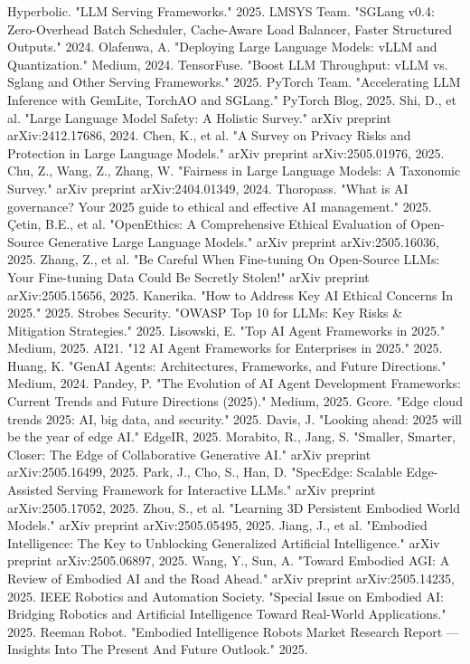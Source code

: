 \documentclass{article}
\begin{document}
\begin{thebibliography}{99}
Hyperbolic. "LLM Serving Frameworks." 2025.
LMSYS Team. "SGLang v0.4: Zero-Overhead Batch Scheduler, Cache-Aware Load Balancer, Faster Structured Outputs." 2024.
Olafenwa, A. "Deploying Large Language Models: vLLM and Quantization." Medium, 2024.
TensorFuse. "Boost LLM Throughput: vLLM vs. Sglang and Other Serving Frameworks." 2025.
PyTorch Team. "Accelerating LLM Inference with GemLite, TorchAO and SGLang." PyTorch Blog, 2025.
Shi, D., et al. "Large Language Model Safety: A Holistic Survey." arXiv preprint arXiv:2412.17686, 2024.
Chen, K., et al. "A Survey on Privacy Risks and Protection in Large Language Models." arXiv preprint arXiv:2505.01976, 2025.
Chu, Z., Wang, Z., Zhang, W. "Fairness in Large Language Models: A Taxonomic Survey." arXiv preprint arXiv:2404.01349, 2024.
Thoropass. "What is AI governance? Your 2025 guide to ethical and effective AI management." 2025.
Çetin, B.E., et al. "OpenEthics: A Comprehensive Ethical Evaluation of Open-Source Generative Large Language Models." arXiv preprint arXiv:2505.16036, 2025.
Zhang, Z., et al. "Be Careful When Fine-tuning On Open-Source LLMs: Your Fine-tuning Data Could Be Secretly Stolen!" arXiv preprint arXiv:2505.15656, 2025.
Kanerika. "How to Address Key AI Ethical Concerns In 2025." 2025.
Strobes Security. "OWASP Top 10 for LLMs: Key Risks \& Mitigation Strategies." 2025.
Lisowski, E. "Top AI Agent Frameworks in 2025." Medium, 2025.
AI21. "12 AI Agent Frameworks for Enterprises in 2025." 2025.
Huang, K. "GenAI Agents: Architectures, Frameworks, and Future Directions." Medium, 2024.
Pandey, P. "The Evolution of AI Agent Development Frameworks: Current Trends and Future Directions (2025)." Medium, 2025.
Gcore. "Edge cloud trends 2025: AI, big data, and security." 2025.
Davis, J. "Looking ahead: 2025 will be the year of edge AI." EdgeIR, 2025.
Morabito, R., Jang, S. "Smaller, Smarter, Closer: The Edge of Collaborative Generative AI." arXiv preprint arXiv:2505.16499, 2025.
Park, J., Cho, S., Han, D. "SpecEdge: Scalable Edge-Assisted Serving Framework for Interactive LLMs." arXiv preprint arXiv:2505.17052, 2025.
Zhou, S., et al. "Learning 3D Persistent Embodied World Models." arXiv preprint arXiv:2505.05495, 2025.
Jiang, J., et al. "Embodied Intelligence: The Key to Unblocking Generalized Artificial Intelligence." arXiv preprint arXiv:2505.06897, 2025.
Wang, Y., Sun, A. "Toward Embodied AGI: A Review of Embodied AI and the Road Ahead." arXiv preprint arXiv:2505.14235, 2025.
IEEE Robotics and Automation Society. "Special Issue on Embodied AI: Bridging Robotics and Artificial Intelligence Toward Real-World Applications." 2025.
Reeman Robot. "Embodied Intelligence Robots Market Research Report — Insights Into The Present And Future Outlook." 2025.
\end{thebibliography}
\end{document}
